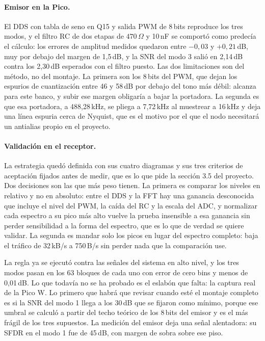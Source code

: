 \paragraph{Emisor en la Pico.} El DDS con tabla de seno en Q15 y salida PWM de
8\,bits reproduce los tres modos, y el filtro RC de dos etapas de
$470\,\Omega$ y 10\,nF se comportó como predecía el cálculo: los errores de
amplitud medidos quedaron entre $-0{,}03$ y $+0{,}21$\,dB, muy por debajo del
margen de 1,5\,dB, y la SNR del modo 3 salió en 2,14\,dB contra los 2,30\,dB
esperados con el filtro puesto. Las dos limitaciones son del método, no del
montaje. La primera son los 8\,bits del PWM, que dejan los espurios de
cuantización entre 46 y 58\,dB por debajo del tono más débil: alcanza para este
banco, y subir ese margen obligaría a bajar la portadora. La segunda es que esa
portadora, a 488,28\,kHz, se pliega a 7,72\,kHz al muestrear a 16\,kHz y deja una
línea espuria cerca de Nyquist, que es el motivo por el que el nodo necesitará un
antialias propio en el proyecto.

\paragraph{Validación en el receptor.} La estrategia quedó definida con sus cuatro
diagramas y sus tres criterios de aceptación fijados antes de medir, que es lo que
pide la sección 3.5 del proyecto. Dos decisiones son las que más peso tienen. La
primera es comparar los niveles en relativo y no en absoluto: entre el DDS y la
FFT hay una ganancia desconocida que incluye el nivel del PWM, la caída del RC y
la escala del ADC, y normalizar cada espectro a su pico más alto vuelve la prueba
insensible a esa ganancia sin perder sensibilidad a la forma del espectro, que es
lo que de verdad se quiere validar. La segunda es mandar solo los picos en lugar
del espectro completo: baja el tráfico de 32\,kB/s a 750\,B/s sin perder nada que
la comparación use.

La regla ya se ejecutó contra las señales del sistema en alto nivel, y los tres
modos pasan en los 63 bloques de cada uno con error de cero bins y menos de
0,01\,dB. Lo que todavía no se ha probado es el eslabón que falta: la captura real
de la Pico W. Lo primero que habrá que revisar cuando esté el montaje completo es
si la SNR del modo 1 llega a los 30\,dB que se fijaron como mínimo, porque ese
umbral se calculó a partir del techo teórico de los 8\,bits del emisor y es el más
frágil de los tres supuestos. La medición del emisor deja una señal alentadora:
su SFDR en el modo 1 fue de 45\,dB, con margen de sobra sobre ese piso.
